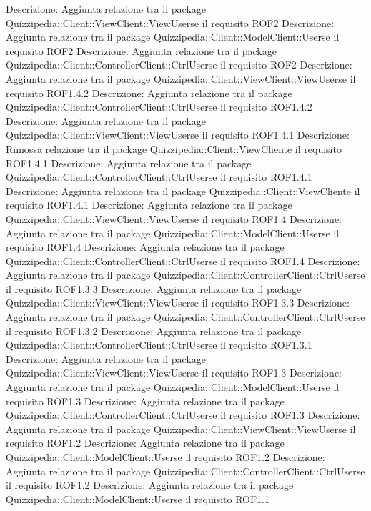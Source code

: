 Descrizione: Aggiunta relazione tra il package Quizzipedia::Client::ViewClient::ViewUserse il requisito ROF2 
Descrizione: Aggiunta relazione tra il package Quizzipedia::Client::ModelClient::Userse il requisito ROF2 
Descrizione: Aggiunta relazione tra il package Quizzipedia::Client::ControllerClient::CtrlUserse il requisito ROF2 
Descrizione: Aggiunta relazione tra il package Quizzipedia::Client::ViewClient::ViewUserse il requisito ROF1.4.2 
Descrizione: Aggiunta relazione tra il package Quizzipedia::Client::ControllerClient::CtrlUserse il requisito ROF1.4.2 
Descrizione: Aggiunta relazione tra il package Quizzipedia::Client::ViewClient::ViewUserse il requisito ROF1.4.1 
Descrizione: Rimossa relazione tra il package Quizzipedia::Client::ViewCliente il requisito ROF1.4.1 
Descrizione: Aggiunta relazione tra il package Quizzipedia::Client::ControllerClient::CtrlUserse il requisito ROF1.4.1 
Descrizione: Aggiunta relazione tra il package Quizzipedia::Client::ViewCliente il requisito ROF1.4.1 
Descrizione: Aggiunta relazione tra il package Quizzipedia::Client::ViewClient::ViewUserse il requisito ROF1.4 
Descrizione: Aggiunta relazione tra il package Quizzipedia::Client::ModelClient::Userse il requisito ROF1.4 
Descrizione: Aggiunta relazione tra il package Quizzipedia::Client::ControllerClient::CtrlUserse il requisito ROF1.4 
Descrizione: Aggiunta relazione tra il package Quizzipedia::Client::ControllerClient::CtrlUserse il requisito ROF1.3.3 
Descrizione: Aggiunta relazione tra il package Quizzipedia::Client::ViewClient::ViewUserse il requisito ROF1.3.3 
Descrizione: Aggiunta relazione tra il package Quizzipedia::Client::ControllerClient::CtrlUserse il requisito ROF1.3.2 
Descrizione: Aggiunta relazione tra il package Quizzipedia::Client::ControllerClient::CtrlUserse il requisito ROF1.3.1 
Descrizione: Aggiunta relazione tra il package Quizzipedia::Client::ViewClient::ViewUserse il requisito ROF1.3 
Descrizione: Aggiunta relazione tra il package Quizzipedia::Client::ModelClient::Userse il requisito ROF1.3 
Descrizione: Aggiunta relazione tra il package Quizzipedia::Client::ControllerClient::CtrlUserse il requisito ROF1.3 
Descrizione: Aggiunta relazione tra il package Quizzipedia::Client::ViewClient::ViewUserse il requisito ROF1.2 
Descrizione: Aggiunta relazione tra il package Quizzipedia::Client::ModelClient::Userse il requisito ROF1.2 
Descrizione: Aggiunta relazione tra il package Quizzipedia::Client::ControllerClient::CtrlUserse il requisito ROF1.2 
Descrizione: Aggiunta relazione tra il package Quizzipedia::Client::ModelClient::Userse il requisito ROF1.1 
